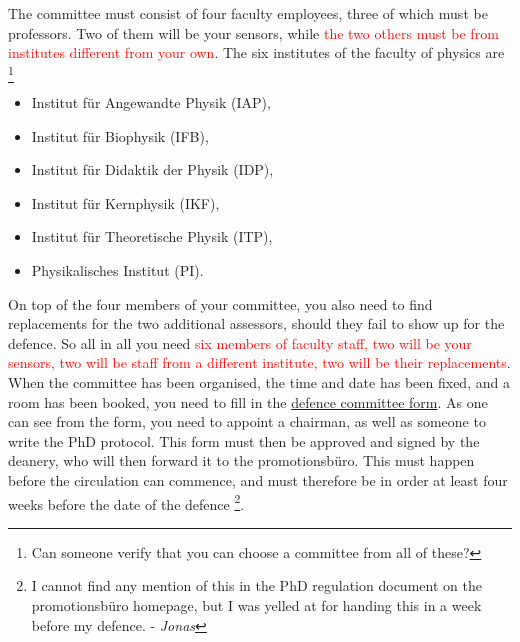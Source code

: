 \documentclass[a4paper]{article}
\begin{document}
      The committee must consist of four faculty employees, three of which must
      be professors. Two of them will be your sensors, while \textcolor{red}{the
        two others must be from institutes different from your own}. The six
      institutes of the faculty of physics are%
      \footnote{Can someone verify that you can choose a committee from all of
        these?}
      \begin{multicols}{2}
        \begin{itemize}
          \item Institut f\"ur Angewandte Physik (IAP),
          \item Institut f\"ur Biophysik (IFB),
          \item Institut f\"ur Didaktik der Physik (IDP),
          \item Institut f\"ur Kernphysik (IKF),
          \item Institut f\"ur Theoretische Physik (ITP),
          \item Physikalisches Institut (PI).
        \end{itemize}
      \end{multicols}
      On top of the four members of your committee, you also need to find
      replacements for the two additional assessors, should they fail to show up
      for the defence. So all in all you need \textcolor{red}{six members of
        faculty staff, two will be your sensors, two will be staff from a
        different institute, two will be their replacements}. When the committee
      has been organised, the time and date has been fixed, and a room has been
      booked, you need to fill in the \href{run:Prufungskommission.pdf}{defence
        committee form}. As one can see from the form, you need to appoint a
      chairman, as well as someone to write the PhD protocol. This form must
      then be approved and signed by the deanery, who will then forward it to
      the promotionsb\"uro. This must happen before the circulation can
      commence, and must therefore be in order at least four weeks before the
      date of the defence%
      \footnote{I cannot find any mention of this in the PhD regulation document
        on the promotionsb\"uro homepage, but I was yelled at for handing this
        in a week before my defence. - \emph{Jonas}}.
    
\end{document}
